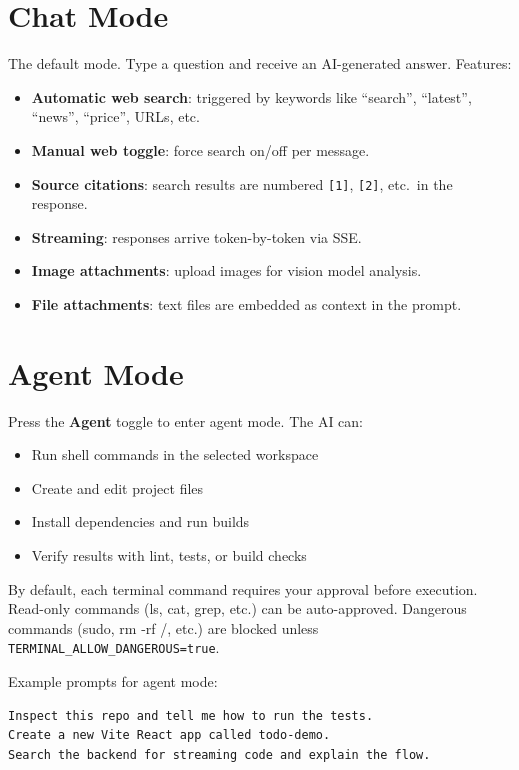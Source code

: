 \documentclass[a4paper,11pt,twoside]{report}
\begin{document}
\section{Chat Mode}
The default mode. Type a question and receive an AI-generated answer. Features:
\begin{itemize}
  \item \textbf{Automatic web search}: triggered by keywords like ``search'', ``latest'', ``news'', ``price'', URLs, etc.
  \item \textbf{Manual web toggle}: force search on/off per message.
  \item \textbf{Source citations}: search results are numbered \texttt{[1]}, \texttt{[2]}, etc.\ in the response.
  \item \textbf{Streaming}: responses arrive token-by-token via SSE.
  \item \textbf{Image attachments}: upload images for vision model analysis.
  \item \textbf{File attachments}: text files are embedded as context in the prompt.
\end{itemize}

\section{Agent Mode}
Press the \textbf{Agent} toggle to enter agent mode. The AI can:
\begin{itemize}
  \item Run shell commands in the selected workspace
  \item Create and edit project files
  \item Install dependencies and run builds
  \item Verify results with lint, tests, or build checks
\end{itemize}

\begin{warnbox}
By default, each terminal command requires your approval before execution. Read-only commands (ls, cat, grep, etc.) can be auto-approved. Dangerous commands (sudo, rm -rf /, etc.) are blocked unless \texttt{TERMINAL\_ALLOW\_DANGEROUS=true}.
\end{warnbox}

\noindent Example prompts for agent mode:
\begin{lstlisting}
Inspect this repo and tell me how to run the tests.
Create a new Vite React app called todo-demo.
Search the backend for streaming code and explain the flow.
\end{lstlisting}
\end{document}
